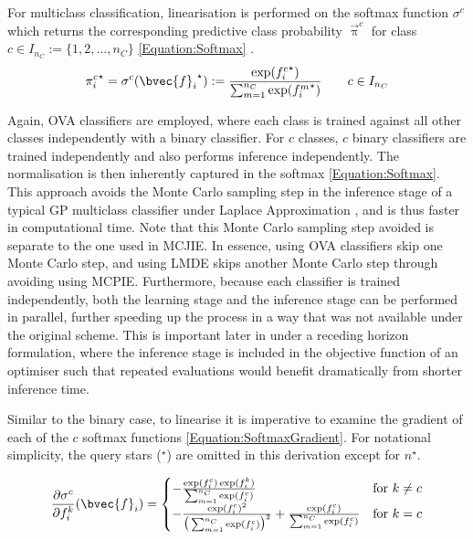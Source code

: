 			For multiclass classification, linearisation is performed on the softmax function $\sigma^{c}$ which returns the corresponding predictive class probability $\vec{\uppi}^{c}$ for class $c \in I_{n_{C}} := \{1, 2, \dots, n_{C}\}$ \eqref{Equation:Softmax} \citep{GaussianProcessForMachineLearning}. \begin{equation}
				{\pi^{c}_{i}}^{\star} = \sigma^{c}({\bvec{f}_{i}}^{\star}) := \frac{\exp({f^{c}_{i}}^{\star})}{\sum_{m = 1}^{n_{C}} \exp({f^{m}_{i}}^{\star})} \qquad c \in I_{n_{C}}
			\label{Equation:Softmax}
			\end{equation}
			
			Again, OVA classifiers are employed, where each class is trained against all other classes independently with a binary classifier. For $c$ classes, $c$ binary classifiers are trained independently and also performs inference independently. The normalisation is then inherently captured in the softmax \eqref{Equation:Softmax}. This approach avoids the Monte Carlo sampling step in the inference stage of a typical GP multiclass classifier under Laplace Approximation \citep{GaussianProcessForMachineLearning}, and is thus faster in computational time. Note that this Monte Carlo sampling step avoided is separate to the one used in MCJIE. In essence, using OVA classifiers skip one Monte Carlo step, and using LMDE skips another Monte Carlo step through avoiding using MCPIE. Furthermore, because each classifier is trained independently, both the learning stage and the inference stage can be performed in parallel, further speeding up the process in a way that was not available under the original scheme. This is important later in under a receding horizon formulation, where the inference stage is included in the objective function of an optimiser such that repeated evaluations would benefit dramatically from shorter inference time.
			
			Similar to the binary case, to linearise it is imperative to examine the gradient of each of the $c$ softmax functions \eqref{Equation:SoftmaxGradient}. For notational simplicity, the query stars ($^{\star}$) are omitted in this derivation except for $n^{\star}$.
			
			\begin{equation}
				\frac{\partial \sigma^{c}}{\partial f^{k}_{i}}(\bvec{f}_{i}) =
				\begin{cases} 
					- \frac{\exp(f^{c}_{i}) \exp(f^{k}_{i})}{\sum_{m = 1}^{n_{C}} \exp({f^{c}_{i}})} & \text{for } k \neq c  \\
					- \frac{\exp(f^{c}_{i})^{2}}{\big(\sum_{m = 1}^{n_{C}} \exp({f^{c}_{i}})\big)^{2}} + \frac{\exp(f^{c}_{i})}{\sum_{m = 1}^{n_{C}} \exp({f^{c}_{i}})}& \text{for } k = c
				\end{cases}
			\label{Equation:SoftmaxGradient}
			\end{equation}			
		
